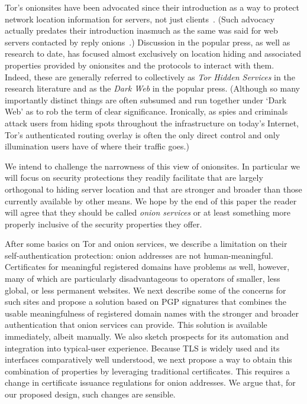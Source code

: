 \documentclass[10pt, conference, compsocconf]{styles/IEEEtran}
\begin{document}
Tor's onionsites have been advocated since their introduction as a way
to protect network location information for servers, not just
clients~\cite{tor-design}. (Such advocacy actually predates their
introduction inasmuch as the same was said for web servers contacted
by reply onions~\cite{onion-routing:cacm99}.)
Discussion in the popular press, as well as research to
date, has focused almost exclusively on location hiding and associated
properties provided by onionsites and the protocols to interact with
them. Indeed, these are generally referred to collectively as
\emph{Tor Hidden Services} in the research literature and as the
\emph{Dark Web} in the popular press. (Although so many importantly
distinct things are often subsumed and run together under `Dark Web'
as to rob the term of clear significance.
Ironically, as spies and criminals attack users from hiding spots
throughout the infrastructure on today's Internet, Tor's
authenticated routing overlay is often the only direct control and
only illumination users have of where their traffic goes.)

We intend to challenge the narrowness of this view of
onionsites. In particular we will focus on security protections they
readily facilitate that are largely orthogonal to hiding server
location and that are stronger and broader than those currently
available by other means. We hope by the end of this paper the reader
will agree that they should be called \emph{onion services} or at
least something more properly inclusive of the security properties
they offer.


After some basics on Tor and onion services, we
describe a limitation on their self-authentication protection: onion
addresses are not human-meaningful. Certificates for meaningful
registered domains have problems as well, however, many of which are
particularly disadvantageous to operators of smaller, less global, or
less permanent websites.  We next describe some of the concerns for
such sites and propose a solution based on PGP signatures that
combines the usable meaningfulness of registered domain names with the
stronger and broader authentication that onion services can
provide.  This solution is available immediately, albeit manually.
We also sketch prospects for its automation and integration
into typical-user experience.
Because TLS is widely used and its interfaces comparatively well
understood, we next propose a way to obtain this
combination of properties by leveraging traditional certificates.
This requires a change in certificate issuance regulations for onion
addresses.  We argue that, for our proposed design, such changes are
sensible.
\end{document}
